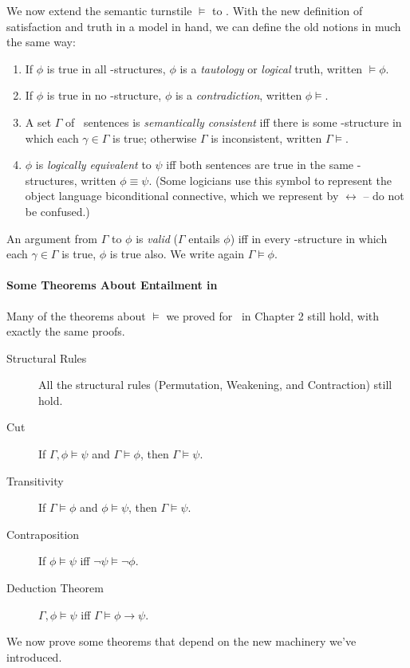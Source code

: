 We now extend the semantic turnstile $\vDash$ to \ltwo. With the new definition of satisfaction and truth in a model in hand, we can define the old notions in much the same way: \begin{enumerate}
	\item If $\phi$ is true in all \ltwo-structures, $\phi$ is a \emph{tautology} or  \emph{logical} truth, written $\vDash\phi$.
	\item If $\phi$ is true in no \ltwo-structure, $\phi$ is a \emph{contradiction}, written $\phi\vDash$.
	\item A set $\Gamma$ of \ltwo\ sentences is \emph{semantically consistent} iff there is some \ltwo-structure in which each $\gamma\in\Gamma$ is true; otherwise $\Gamma$ is inconsistent, written $\Gamma\vDash$.
	\item $\phi$ is \emph{logically equivalent} to $\psi$ iff both sentences are true in the same \ltwo-structures, written $\phi\equiv\psi$. (Some logicians use this symbol to represent the object language biconditional connective, which we represent by $\leftrightarrow$ – do not be confused.)
\end{enumerate}

\begin{definition}
	An argument from $\Gamma$ to $\phi$ is \emph{valid} ($\Gamma$ entails $\phi$) iff in every \ltwo-structure in which each $\gamma\in\Gamma$ is true, $\phi$ is true also. We write again $\Gamma\vDash\phi$.
\end{definition}

\paragraph{Some Theorems About Entailment in \ltwo}

Many of the theorems about $\vDash$ we proved for \lone\ in Chapter 2 still hold, with exactly the same proofs. \begin{description}
\item [Structural Rules] All the structural rules (Permutation, Weakening, and Contraction) still hold.
	\item [Cut] If $\Gamma,\phi\vDash\psi$ and $\Gamma\vDash\phi$, then $\Gamma\vDash\psi$.
	\item [Transitivity] If $\Gamma\vDash\phi$ and $\phi\vDash\psi$, then $\Gamma\vDash\psi$.
	\item [Contraposition] If $\phi\vDash\psi$ iff $\neg\psi\vDash\neg\phi$.
	\item [Deduction Theorem] $\Gamma,\phi\vDash\psi$ iff $\Gamma\vDash\phi\to\psi$.
\end{description} We now prove some theorems that depend on the new machinery we've introduced.

